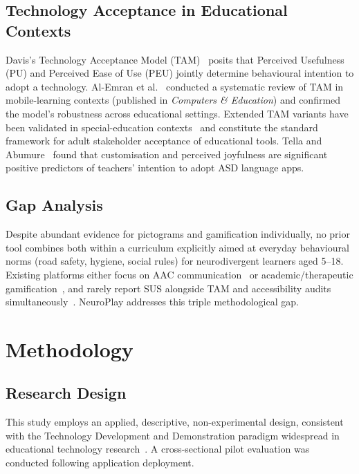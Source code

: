 \documentclass[preprint,12pt]{elsarticle}
\begin{document}
        \subsection{Technology Acceptance in Educational Contexts}
            Davis's Technology Acceptance Model (TAM)~\cite{Davis1989} posits that Perceived Usefulness (PU) and Perceived Ease of Use (PEU) jointly determine behavioural intention to adopt a technology. Al-Emran et al.~\cite{AlEmran2018} conducted a systematic review of TAM in mobile-learning contexts (published in \textit{Computers \& Education}) and confirmed the model's robustness across educational settings. Extended TAM variants have been validated in special-education contexts~\cite{Casas2023,Lopez2023,Tella2025} and constitute the standard framework for adult stakeholder acceptance of educational tools. Tella and Abumure~\cite{Tella2025} found that customisation and perceived joyfulness are significant positive predictors of teachers' intention to adopt ASD language apps.
        
        \subsection{Gap Analysis}
            Despite abundant evidence for pictograms and gamification individually, no prior tool combines both within a curriculum explicitly aimed at everyday behavioural norms (road safety, hygiene, social rules) for neurodivergent learners aged 5--18. Existing platforms either focus on AAC communication~\cite{Soomro2018,El-Seoud2014} or academic/therapeutic gamification~\cite{Lin2025,Harrison2020}, and rarely report SUS alongside TAM and accessibility audits simultaneously~\cite{Chinchay2024}. NeuroPlay addresses this triple methodological gap.
    \section{Methodology}
    \label{sec:method}
        \subsection{Research Design}
            This study employs an applied, descriptive, non-experimental design, consistent with the Technology Development and Demonstration paradigm widespread in educational technology research~\cite{Castro2023}. A cross-sectional pilot evaluation was conducted following application deployment.
            
\end{document}
